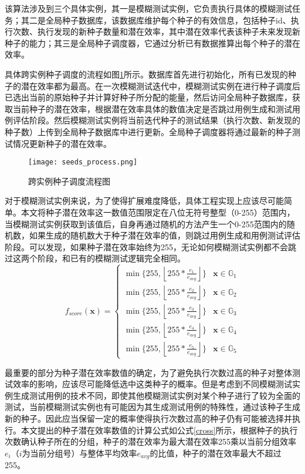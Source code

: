 \documentclass[master]{thesis-uestc}
\begin{document}
该算法涉及到三个具体实例，其一是模糊测试实例，它负责执行具体的模糊测试任务；其二是全局种子数据库，该数据库维护每个种子的有效信息，包括种子id、执行次数、执行发现的新种子数量和潜在效率，其中潜在效率代表该种子未来发现新种子的能力；其三是全局种子调度器，它通过分析已有数据推算出每个种子的潜在效率。

具体跨实例种子调度的流程如图\ref{seeds_process}所示。数据库首先进行初始化，所有已发现的种子的潜在效率都为最高。在一次模糊测试迭代中，模糊测试实例在进行种子调度后已选出当前的原始种子并计算好种子所分配的能量，然后访问全局种子数据库，获取当前种子的潜在效率，根据潜在效率具体的数值决定是否跳过用例生成和测试用例评估阶段。然后模糊测试实例将当前迭代种子的测试结果（执行次数、新发现的种子数）上传到全局种子数据库中进行更新。全局种子调度器将通过最新的种子测试情况更新种子的潜在效率。

\begin{figure}[!htbp]
    \vspace{6pt}
    \centering
    \texttt{[image: seeds\_process.png]}
    \caption{跨实例种子调度流程图}
    \label{seeds_process}
\end{figure}

对于模糊测试实例来说，为了使得扩展难度降低，具体工程实现上应该尽可能简单。本文将种子潜在效率这一数值范围限定在八位无符号整型（0-255）范围内，当模糊测试实例获取到该值后，自身再通过随机的方法产生一个0-255范围内的随机数，如果生成的随机数大于种子潜在效率的值，则跳过用例生成和用例测试评估阶段。可以发现，如果种子潜在效率始终为255，无论如何模糊测试实例都不会跳过这两个阶段，和已有的模糊测试逻辑完全相同。
\begin{equation}
    f_{score}(\bm{x})=
    \begin{cases}
    \min\{255, \left\lfloor  255 * \frac{e_1}{e_{avg}} \right\rfloor\} & \bm{x} \in \mathbb{G}_1 \\
    \min\{255, \left\lfloor  255 * \frac{e_2}{e_{avg}} \right\rfloor\} & \bm{x} \in \mathbb{G}_2 \\
    \min\{255, \left\lfloor  255 * \frac{e_3}{e_{avg}} \right\rfloor\} & \bm{x} \in \mathbb{G}_3 \\
    \min\{255, \left\lfloor  255 * \frac{e_4}{e_{avg}} \right\rfloor\} & \bm{x} \in \mathbb{G}_4 \\
    \min\{255, \left\lfloor  255 * \frac{e_5}{e_{avg}} \right\rfloor\} & \bm{x} \in \mathbb{G}_5 
    \end{cases}
    \label{cross}
\end{equation}

最重要的部分为种子潜在效率数值的确定，为了避免执行次数过高的种子对整体测试效率的影响，应该尽可能降低选中这类种子的概率。但是考虑到不同模糊测试实例生成测试用例的技术不同，即使其他模糊测试实例对某个种子进行了较为全面的测试，当前模糊测试实例也有可能因为其生成测试用例的特殊性，通过该种子生成新的种子。因此应当保留一定的概率使得执行次数过高的种子仍有可能被选择并执行。本文提出的种子潜在效率数值的计算公式如公式\ref{cross}所示，根据种子的执行次数确认种子所在的分组，种子的潜在效率为最大潜在效率255乘以当前分组效率$e_{i}$（$i$为当前分组号）与整体平均效率$e_{avg}$的比值，种子的潜在效率最大不超过255。
\end{document}
